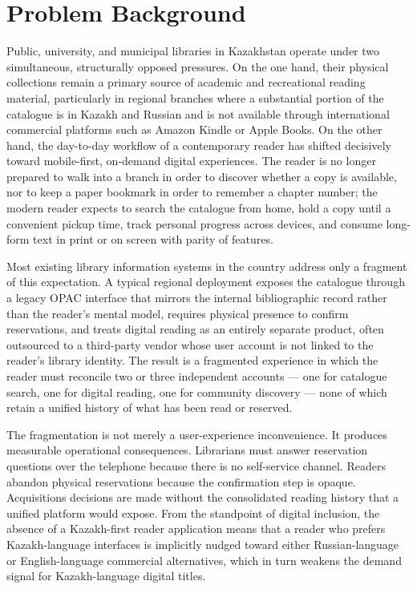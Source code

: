 \documentclass[12pt,a4paper]{report}
\begin{document}
\section{Problem Background}

Public, university, and municipal libraries in Kazakhstan operate under two
simultaneous, structurally opposed pressures. On the one hand, their physical
collections remain a primary source of academic and recreational reading
material, particularly in regional branches where a substantial portion of
the catalogue is in Kazakh and Russian and is not available through
international commercial platforms such as Amazon Kindle or Apple Books. On
the other hand, the day-to-day workflow of a contemporary reader has shifted
decisively toward mobile-first, on-demand digital experiences. The reader is
no longer prepared to walk into a branch in order to discover whether a copy
is available, nor to keep a paper bookmark in order to remember a chapter
number; the modern reader expects to search the catalogue from home, hold a
copy until a convenient pickup time, track personal progress across devices,
and consume long-form text in print or on screen with parity of features.

Most existing library information systems in the country address only a
fragment of this expectation. A typical regional deployment exposes the
catalogue through a legacy OPAC interface that mirrors the internal
bibliographic record rather than the reader's mental model, requires physical
presence to confirm reservations, and treats digital reading as an entirely
separate product, often outsourced to a third-party vendor whose user
account is not linked to the reader's library identity. The result is a
fragmented experience in which the reader must reconcile two or three
independent accounts --- one for catalogue search, one for digital reading,
one for community discovery --- none of which retain a unified history of
what has been read or reserved.

The fragmentation is not merely a user-experience inconvenience. It produces
measurable operational consequences. Librarians must answer reservation
questions over the telephone because there is no self-service channel.
Readers abandon physical reservations because the confirmation step is
opaque. Acquisitions decisions are made without the consolidated reading
history that a unified platform would expose. From the standpoint of digital
inclusion, the absence of a Kazakh-first reader application means that a
reader who prefers Kazakh-language interfaces is implicitly nudged toward
either Russian-language or English-language commercial alternatives, which
in turn weakens the demand signal for Kazakh-language digital titles.
\end{document}

